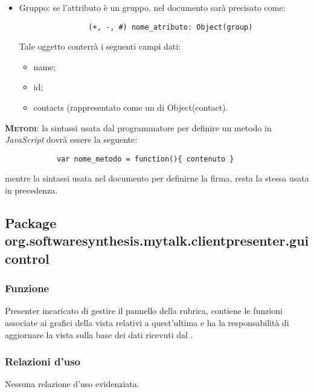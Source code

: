 \begin{description}
\begin{itemize}
\item Gruppo: se l'attributo è un gruppo, nel documento sarà precisato come:
			
			\begin{verbatim}
				(+, -, #) nome_atributo: Object(group)
			\end{verbatim}
			Tale oggetto conterrà i seguenti campi dati:
			\begin{itemize}
			\item name;
			\item id;
			\item contacts (rappresentato come un  di Object(contact).
			\end{itemize}
		\end{itemize}
	\item{\scshape\bfseries Metodi}: la sintassi usata dal programmatore per definire un metodo in \textit{JavaScript} dovrà essere la seguente:
		\begin{verbatim}
			var nome_metodo = function(){ contenuto }
		\end{verbatim}
		
		mentre la sintassi usata nel documento per definirne la firma, resta la stessa usata in precedenza.
	
\end{description}

\subsection{Package org.softwaresynthesis.mytalk.clientpresenter.guicontrol}\label{sec:guicontrol}


\subsubsection*{Funzione}
Presenter incaricato di gestire il pannello della rubrica, contiene le funzioni associate ai  grafici della vista relativi a quest'ultima e ha la responsabilità di aggiornare la vista sulla base dei dati ricevuti dal .

\subsubsection*{Relazioni d'uso}
Nessuna relazione d'uso evidenziata.


